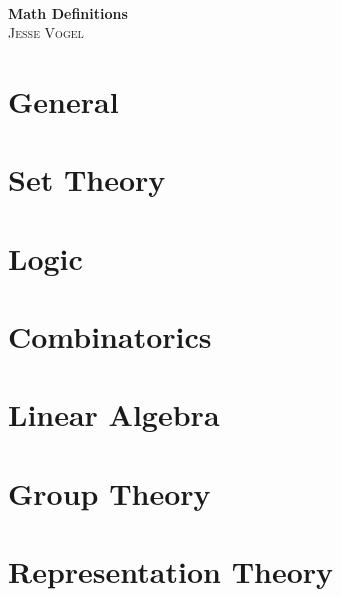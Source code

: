 \documentclass{report}
\begin{document}
\thispagestyle{empty}

\begin{center}
    \; \\ \vspace{5cm} \textbf{\Huge Math Definitions}
    \\ \vspace{2cm}
    \textsc{Jesse Vogel}
\end{center}

\newpage

{
    \tableofcontents
}

\newcommand{\cat}{}

\chapter{General}
\renewcommand{\cat}{GM}


\chapter{Set Theory}
\renewcommand{\cat}{ST}



\chapter{Logic}
\renewcommand{\cat}{LO}


\chapter{Combinatorics}
\renewcommand{\cat}{CO}



\chapter{Linear Algebra}
\renewcommand{\cat}{LA}







\chapter{Group Theory}
\renewcommand{\cat}{GT}


\chapter{Representation Theory}
\renewcommand{\cat}{RT}

\end{document}
